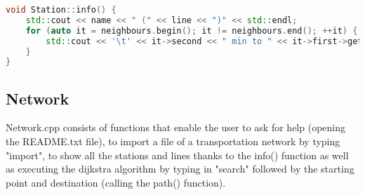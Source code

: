 \documentclass[12pt]{article}
\begin{document}
\begin{lstlisting}[language=C++, caption = info() displays the network]
void Station::info() {
    std::cout << name << " (" << line << ")" << std::endl;
    for (auto it = neighbours.begin(); it != neighbours.end(); ++it) {
        std::cout << '\t' << it->second << " min to " << it->first->getName() << " (" << it->first->getLine() << ")" << std::endl;
    }
}
\end{lstlisting}

\subsection{Network}
Network.cpp consists of functions that enable the user to ask for help (opening the README.txt file), to import a file of a transportation network by typing "import", to show all the stations and lines thanks to the info() function as well as executing the dijkstra algorithm by typing in "search" followed by the starting point and destination (calling the path() function).\\
\end{document}
